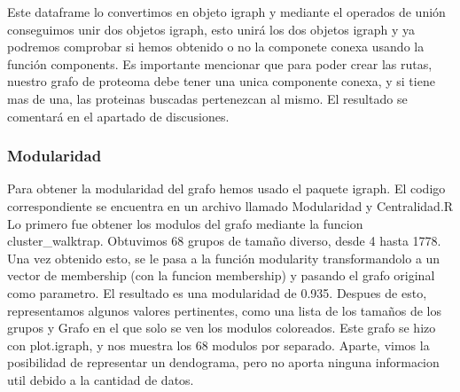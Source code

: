 Este dataframe lo convertimos en objeto igraph y mediante el operados de unión conseguimos unir dos objetos igraph, esto unirá los dos objetos igraph y ya podremos comprobar si hemos obtenido o no la componete conexa usando la función components. Es importante mencionar que para poder crear las rutas, nuestro grafo de proteoma debe tener una unica componente conexa, y si tiene mas de una, las proteinas buscadas pertenezcan al mismo. El resultado se comentará en el apartado de discusiones. 

\subsubsection{Modularidad}

Para obtener la modularidad del grafo hemos usado el paquete igraph. El codigo correspondiente se encuentra en un archivo llamado Modularidad y Centralidad.R
Lo primero fue obtener los modulos del grafo mediante la funcion cluster_walktrap. Obtuvimos 68 grupos de tamaño diverso, desde 4 hasta 1778. Una vez obtenido esto, se le pasa a la función modularity transformandolo a un vector de membership (con la funcion membership) y pasando el grafo original como parametro. El resultado es una modularidad de 0.935.
Despues de esto, representamos algunos valores pertinentes, como una lista de los tamaños de los grupos y Grafo en el que solo se ven los modulos coloreados.
Este grafo se hizo con plot.igraph, y nos muestra los 68 modulos por separado.
Aparte, vimos la posibilidad de representar un dendograma, pero no aporta ninguna informacion util debido a la cantidad de datos.




